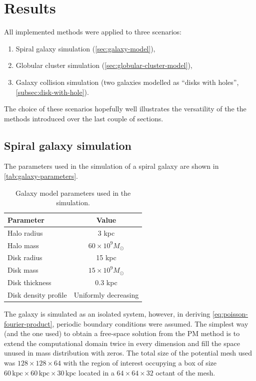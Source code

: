 \section{Results}
All implemented methods were applied to three scenarios:
\begin{enumerate}
    \item Spiral galaxy simulation (\autoref{sec:galaxy-model}),
    \item Globular cluster simulation (\autoref{sec:globular-cluster-model}),
    \item Galaxy collision simulation (two galaxies modelled as ``disks with holes'', \autoref{subsec:disk-with-hole}).
\end{enumerate}
The choice of these scenarios hopefully well illustrates the versatility of the the methods introduced over the last couple of sections.

\subsection{Spiral galaxy simulation}
The parameters used in the simulation of a spiral galaxy are shown in \autoref{tab:galaxy-parameters}.
\begin{table}[htp]
    \centering
    \begin{tabular}{|l|c|}
        \hline
        \textbf{Parameter}   & \textbf{Value}           \\
        \hline
        Halo radius          & 3 kpc                    \\
        Halo mass            & $60 \times 10^9 M_\odot$ \\
        Disk radius          & 15 kpc                   \\
        Disk mass            & $15 \times 10^9 M_\odot$ \\
        Disk thickness       & 0.3 kpc                  \\
        Disk density profile & Uniformly decreasing     \\
        \hline
    \end{tabular}
    \caption{Galaxy model parameters used in the simulation.}
    \label{tab:galaxy-parameters}
\end{table}
The galaxy is simulated as an isolated system, however, in deriving \autoref{eq:poisson-fourier-product}, periodic boundary conditions were assumed.
The simplest way (and the one used) to obtain a free-space solution from the PM method is to extend the computational domain twice in every dimension and fill the space unused in mass distribution with zeros.
The total size of the potential mesh used was $128 \times 128 \times 64$ with the region of interest occupying a box of size $60\, \text{kpc}\times 60\, \text{kpc}\times 30\, \text{kpc}$ located in a $64 \times 64 \times 32$ octant of the mesh.

